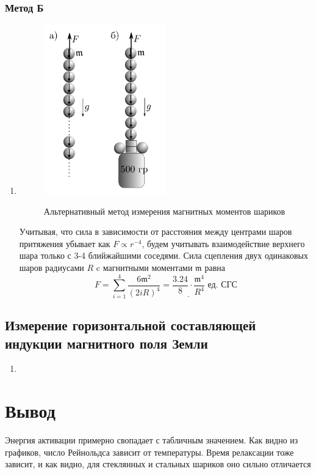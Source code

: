 \documentclass[11pt,a4paper]{article}
\newcommand{\mk}{\mathfrak}
\begin{document}
\subsubsection*{Метод Б}
\begin{enumerate}
  \item \begin{figure}[H]
    \includegraphics*[width=0.5\textwidth]{2023-10-02-00-43-23.png}
    \label{ust:met_b}
    \caption{Альтернативный ме­тод измерения магнитных
    моментов шариков}
  \end{figure}
  Учитывая, что
  сила в зависимости от расстояния между центрами шаров притяжения убывает как $F\varpropto r^{-4}$, будем учитывать взаимодействие верхнего шара только с 3-4 блийжайшими соседями. Сила сцепления двух одинаковых шаров радиусами $R$ c магнитными моментами $\mathfrak{m}$ равна $$F = \sum_{i=1}^{4} \frac{6\mk m^2}{(2iR)^4} = \underline{\frac{3.24}{8}\cdot\frac{\mathfrak{m}^4}{R^4}}\text{ ед. СГС}$$
\end{enumerate}

\subsection*{Измерение горизонтальной составляющей индукции магнитного
поля Земли}\begin{enumerate}
  \item 
\end{enumerate}


\section*{Вывод}
Энергия активации примерно свопадает с табличным значением.
Как видно из графиков, число Рейнольдса зависит от температуры.
Время релаксации тоже зависит, и как видно, для стеклянных и стальных шариков оно сильно отличается
\end{document}
